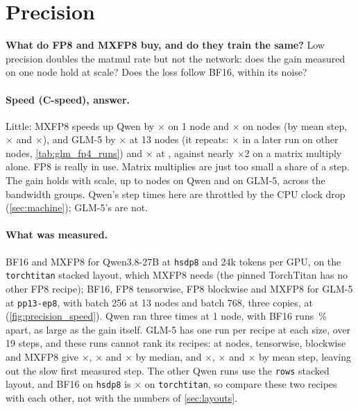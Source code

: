 \section{Precision}
\label{sec:precision}

\begin{question}
  \textbf{What do FP8 and MXFP8 buy, and do they train the same?} Low precision doubles the matmul rate but not the network: does the gain measured on one node hold at scale? Does the loss follow BF16, within its noise?
\end{question}

\paragraph{Speed (C-speed), answer.} Little: MXFP8 speeds up Qwen by $\times$\TriQwenFpOne{} on 1 node and $\times$\TriQwenFpTop{} on \TriQwenFpTopNodes{} nodes (by mean step, $\times$\TriQwenFpOneMean{} and $\times$\TriQwenFpTopMean), and GLM-5 by $\times$\TriGlmFpMx{} at 13 nodes (it repeats: $\times$\TriFpFourMxBfSpeed{} in a later run on other nodes, \cref{tab:glm_fp4_runs}) and $\times$\TriGlmFpMxTop{} at \TriGlmFpTopNodes, against nearly $\times$2 on a matrix multiply alone. FP8 is really in use. Matrix multiplies are just too small a share of a step. The gain holds with scale, up to \TriQwenFpTopNodes{} nodes on Qwen and \TriGlmFpTopNodes{} on GLM-5, across the bandwidth groups. Qwen's step times here are throttled by the CPU clock drop (\cref{sec:machine}); GLM-5's are not.

\paragraph{What was measured.} BF16 and MXFP8 for Qwen3.8-27B at \texttt{hsdp8} and 24k tokens per GPU, on the \texttt{torchtitan} stacked layout, which MXFP8 needs (the pinned TorchTitan has no other FP8 recipe); BF16, FP8 tensorwise, FP8 blockwise and MXFP8 for GLM-5 at \texttt{pp13-ep8}, with batch 256 at 13 nodes and batch 768, three copies, at \TriGlmFpTopNodes{} (\cref{fig:precision_speed}). Qwen ran three times at 1 node, with BF16 runs \TriQwenFpOneSpread\,\% apart, as large as the gain itself. GLM-5 has one run per recipe at each size, over 19 steps, and these runs cannot rank its recipes: at \TriGlmFpTopNodes{} nodes, tensorwise, blockwise and MXFP8 give $\times$\TriGlmFpTensorTop, $\times$\TriGlmFpBlockTop{} and $\times$\TriGlmFpMxTop{} by median, and $\times$\TriGlmFpTensorTopMean, $\times$\TriGlmFpBlockTopMean{} and $\times$\TriGlmFpMxTopMean{} by mean step, leaving out the slow first measured step. The other Qwen runs use the \texttt{rows} stacked layout, and BF16 on \texttt{hsdp8} is $\times$\TriStackedGain{} on \texttt{torchtitan}, so compare these two recipes with each other, not with the numbers of \cref{sec:layouts}.

